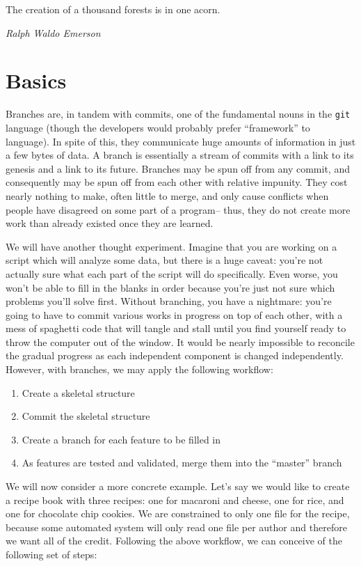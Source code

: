 \epigraph{The creation of a thousand forests is in one acorn.}
{\textit{Ralph Waldo Emerson}}

\section{Basics}
\par{
Branches are, in tandem with commits, one of the fundamental nouns in the
\verb+git+ language (though the developers would probably prefer ``framework''
to language). In spite of this, they communicate huge amounts of information
in just a few bytes of data. A branch is essentially a stream of commits with
a link to its genesis and a link to its future. Branches may be spun off from
any commit, and consequently may be spun off from each other with relative
impunity. They cost nearly nothing to make, often little to merge, and only
cause conflicts when people have disagreed on some part of a program-- thus,
they do not create more work than already existed once they are learned.
}

\par{
We will have another thought experiment. Imagine that you are working on a
script which will analyze some data, but there is a huge caveat: you're not
actually sure what each part of the script will do specifically. Even worse,
you won't be able to fill in the blanks in order because you're just not sure
which problems you'll solve first. Without branching, you have a nightmare:
you're going to have to commit various works in progress on top of each other,
with a mess of spaghetti code that will tangle and stall until you find
yourself ready to throw the computer out of the window. It would be nearly
impossible to reconcile the gradual progress as each independent component is
changed independently. However, with branches, we may apply the following
workflow:
}

\begin{enumerate}
    \item Create a skeletal structure
    \item Commit the skeletal structure
    \item Create a branch for each feature to be filled in
    \item As features are tested and validated, merge them into the ``master''
    branch
\end{enumerate}

\par{
We will now consider a more concrete example. Let's say we would like to
create a recipe book with three recipes: one for macaroni and cheese, one for
rice, and one for chocolate chip cookies. We are constrained to only one file
for the recipe, because some automated system will only read one file per
author and therefore we want all of the credit. Following the above workflow,
we can conceive of the following set of steps:
}

